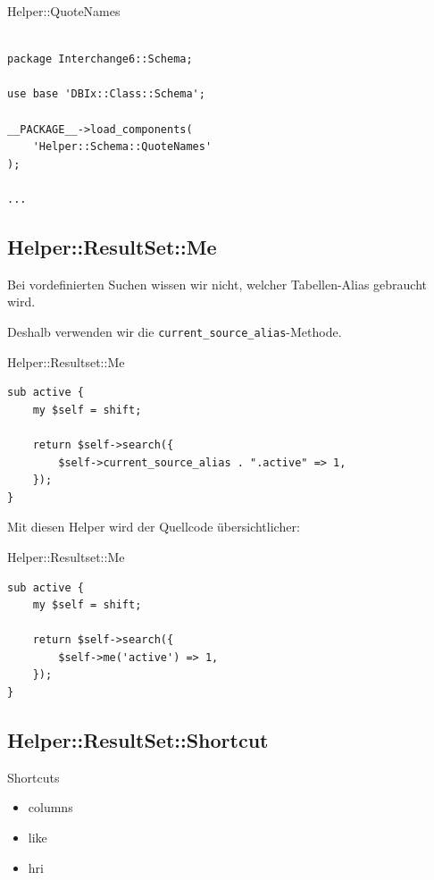 \begin{frame}[fragile]{Helper::QuoteNames}
\begin{lstlisting}

package Interchange6::Schema;

use base 'DBIx::Class::Schema';

__PACKAGE__->load_components( 
    'Helper::Schema::QuoteNames' 
);

...

\end{lstlisting}
\end{frame}

\subsection{Helper::ResultSet::Me}

Bei vordefinierten Suchen wissen wir nicht, welcher Tabellen-Alias
gebraucht wird.

Deshalb verwenden wir die \verb|current_source_alias|-Methode.

\begin{frame}[fragile]{Helper::Resultset::Me}
\begin{lstlisting}
sub active {
    my $self = shift;

    return $self->search({ 
        $self->current_source_alias . ".active" => 1,
    });
}
\end{lstlisting}
\end{frame}

Mit diesen Helper wird der Quellcode übersichtlicher:

\begin{frame}[fragile]{Helper::Resultset::Me}
\begin{lstlisting}
sub active {
    my $self = shift;

    return $self->search({ 
        $self->me('active') => 1,
    });
}
\end{lstlisting}
\end{frame}

\subsection{Helper::ResultSet::Shortcut}




\begin{frame}{Shortcuts}
\begin{itemize}
\item columns
\item like
\item hri
\end{itemize}
\end{frame}

